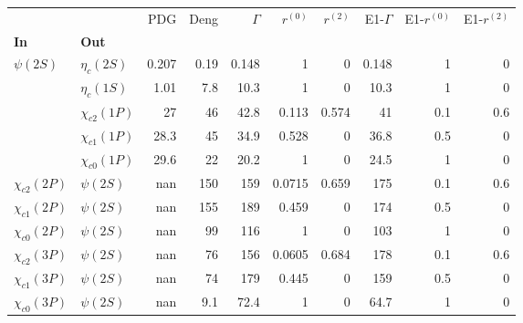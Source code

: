 \begin{tabular}{l|l|r|r|r|r|r|r|r|r}
\toprule
                &            &   PDG &  Deng &  $\Gamma$ &  $r^{(0)}$ &  $r^{(2)}$ &  E1-$\Gamma$ &  E1-$r^{(0)}$ &  E1-$r^{(2)}$ \\
\textbf{In} & \textbf{Out} &       &       &           &            &            &              &               &               \\
\midrule
\textbf{$\psi(2S)$} & \textbf{$\eta_{c}(2S)$} & 0.207 &  0.19 &     0.148 &          1 &          0 &        0.148 &             1 &             0 \\
                & \textbf{$\eta_{c}(1S)$} &  1.01 &   7.8 &      10.3 &          1 &          0 &         10.3 &             1 &             0 \\
                & \textbf{$\chi_{c2}(1P)$} &    27 &    46 &      42.8 &      0.113 &      0.574 &           41 &           0.1 &           0.6 \\
                & \textbf{$\chi_{c1}(1P)$} &  28.3 &    45 &      34.9 &      0.528 &          0 &         36.8 &           0.5 &             0 \\
                & \textbf{$\chi_{c0}(1P)$} &  29.6 &    22 &      20.2 &          1 &          0 &         24.5 &             1 &             0 \\
\textbf{$\chi_{c2}(2P)$} & \textbf{$\psi(2S)$} &   nan &   150 &       159 &     0.0715 &      0.659 &          175 &           0.1 &           0.6 \\
\textbf{$\chi_{c1}(2P)$} & \textbf{$\psi(2S)$} &   nan &   155 &       189 &      0.459 &          0 &          174 &           0.5 &             0 \\
\textbf{$\chi_{c0}(2P)$} & \textbf{$\psi(2S)$} &   nan &    99 &       116 &          1 &          0 &          103 &             1 &             0 \\
\textbf{$\chi_{c2}(3P)$} & \textbf{$\psi(2S)$} &   nan &    76 &       156 &     0.0605 &      0.684 &          178 &           0.1 &           0.6 \\
\textbf{$\chi_{c1}(3P)$} & \textbf{$\psi(2S)$} &   nan &    74 &       179 &      0.445 &          0 &          159 &           0.5 &             0 \\
\textbf{$\chi_{c0}(3P)$} & \textbf{$\psi(2S)$} &   nan &   9.1 &      72.4 &          1 &          0 &         64.7 &             1 &             0 \\
\bottomrule
\end{tabular}
